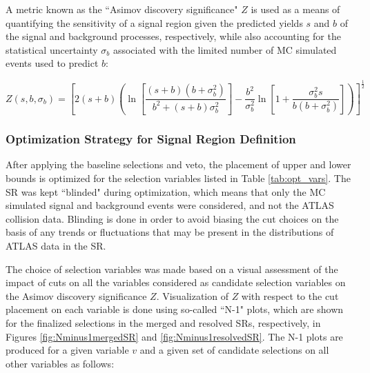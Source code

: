 A metric known as the ``Asimov discovery significance" \cite{Buttinger:2643488} \(Z\) is used as a means of quantifying the sensitivity of a signal region given the predicted yields \(s\) and \(b\) of the signal and background processes, respectively, while also accounting for the statistical uncertainty \(\sigma_b\) associated with the limited number of MC simulated events used to predict \(b\):

\begin{equation}
  \label{eq:asimov}
  Z(s, b, \sigma_b) = \left[ 2(s+b)\left(
    \ln\left[ \frac{(s+b)(b+\sigma_b^2)}{b^2 + (s+b)\sigma_b^2} \right]
    - \frac{b^2}{\sigma_b^2}\ln\left[ 1 + \frac{\sigma_b^2 s}{b(b+\sigma_b^2)} \right]
  \right) \right]^\frac{1}{2}
\end{equation}

\subsubsection{Optimization Strategy for Signal Region Definition}
\label{sec:sr_opt}

After applying the baseline selections and \bjet veto, the placement of upper and lower bounds is optimized for the selection variables listed in Table \ref{tab:opt_vars}. The SR was kept ``blinded" during optimization, which means that only the MC simulated signal and background events were considered, and not the ATLAS collision data. Blinding is done in order to avoid biasing the cut choices on the basis of any trends or fluctuations that may be present in the distributions of ATLAS data in the SR.  

The choice of selection variables was made based on a visual assessment of the impact of cuts on all the variables considered as candidate selection variables on the Asimov discovery significance \(Z\). Visualization of \(Z\) with respect to the cut placement on each variable is done using so-called ``N-1" plots, which are shown for the finalized selections in the merged and resolved SRs, respectively, in Figures \ref{fig:Nminus1mergedSR} and \ref{fig:Nminus1resolvedSR}. The N-1 plots are produced for a given variable \(v\) and a given set of candidate selections on all other variables as follows:

